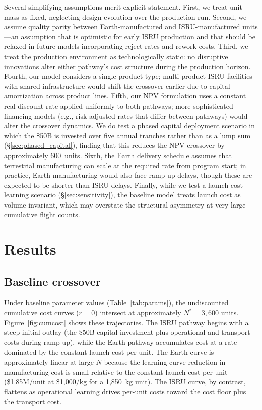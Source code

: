\documentclass[preprint,12pt]{elsarticle}
\begin{document}
Several simplifying assumptions merit explicit statement. First, we treat unit mass as fixed, neglecting design evolution over the production run. Second, we assume quality parity between Earth-manufactured and ISRU-manufactured units---an assumption that is optimistic for early ISRU production and that should be relaxed in future models incorporating reject rates and rework costs. Third, we treat the production environment as technologically static: no disruptive innovations alter either pathway's cost structure during the production horizon. Fourth, our model considers a single product type; multi-product ISRU facilities with shared infrastructure would shift the crossover earlier due to capital amortization across product lines. Fifth, our NPV formulation uses a constant real discount rate applied uniformly to both pathways; more sophisticated financing models (e.g., risk-adjusted rates that differ between pathways) would alter the crossover dynamics. We do test a phased capital deployment scenario in which the \$50B is invested over five annual tranches rather than as a lump sum (\S\ref{sec:phased_capital}), finding that this reduces the NPV crossover by approximately 600~units. Sixth, the Earth delivery schedule assumes that terrestrial manufacturing can scale at the required rate from program start; in practice, Earth manufacturing would also face ramp-up delays, though these are expected to be shorter than ISRU delays. Finally, while we test a launch-cost learning scenario (\S\ref{sec:sensitivity}), the baseline model treats launch cost as volume-invariant, which may overstate the structural asymmetry at very large cumulative flight counts.

\section{Results}
\label{sec:results}

\subsection{Baseline crossover}

Under baseline parameter values (Table~\ref{tab:params}), the undiscounted cumulative cost curves ($r = 0$) intersect at approximately $N^* = 3{,}600$ units. Figure~\ref{fig:cumcost} shows these trajectories. The ISRU pathway begins with a steep initial outlay (the \$50B capital investment plus operational and transport costs during ramp-up), while the Earth pathway accumulates cost at a rate dominated by the constant launch cost per unit. The Earth curve is approximately linear at large $N$ because the learning-curve reduction in manufacturing cost is small relative to the constant launch cost per unit (\$1.85M/unit at \$1{,}000/kg for a 1{,}850~kg unit). The ISRU curve, by contrast, flattens as operational learning drives per-unit costs toward the cost floor plus the transport cost.
\end{document}
